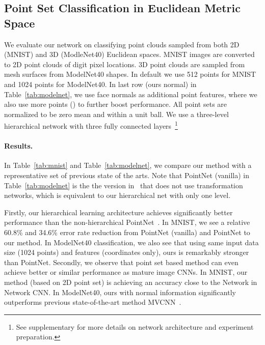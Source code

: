 \documentclass{article}
\begin{document}
\vspace{-0.3cm}
\subsection{Point Set Classification in Euclidean Metric Space}

We evaluate our network on classifying point clouds sampled from both 2D (MNIST) and 3D (ModleNet40) Euclidean spaces. MNIST images are converted to 2D point clouds of digit pixel locations. 3D point clouds are sampled from mesh surfaces from ModelNet40 shapes. In default we use 512 points for MNIST and 1024 points for ModelNet40. In last row (ours normal) in Table~\ref{tab:modelnet}, we use face normals as additional point features, where we also use more points () to further boost performance. All point sets are normalized to be zero mean and within a unit ball. We use a three-level hierarchical network with three fully connected layers~\footnote{See supplementary for more details on network architecture and experiment preparation.}











\vspace{-0.3cm}
\paragraph{Results.} In Table~\ref{tab:mnist} and Table~\ref{tab:modelnet}, we compare our method with a representative set of previous state of the arts. Note that PointNet (vanilla) in Table~\ref{tab:modelnet} is the the version in~\cite{qi2016pointnet} that does not use transformation networks, which is equivalent to our hierarchical net with only one level.

Firstly, our hierarchical learning architecture achieves significantly better performance than the non-hierarchical PointNet~\cite{qi2016pointnet}. In MNIST, we see a relative 60.8\% and 34.6\% error rate reduction from PointNet (vanilla) and PointNet to our method. In ModelNet40 classification, we also see that using same input data size (1024 points) and features (coordinates only), ours is remarkably stronger than PointNet.
Secondly, we observe that point set based method can even achieve better or similar performance as mature image CNNs. In MNIST, our method (based on 2D point set) is achieving an accuracy close to the Network in Network CNN. In ModelNet40, ours with normal information significantly outperforms previous state-of-the-art method MVCNN~\cite{su15mvcnn}. 
\end{document}

